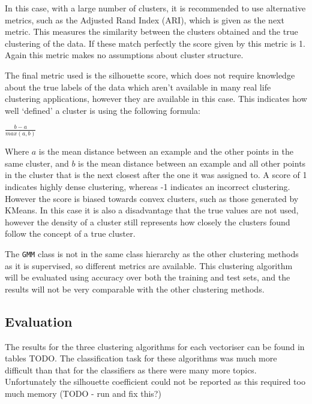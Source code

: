 \documentclass{article}
\begin{document}
In this case, with a large number of clusters, it is recommended to use alternative metrics, such as the Adjusted Rand Index (ARI), which is given as the next metric. This measures the similarity between the clusters obtained and the true clustering of the data. If these match perfectly the score given by this metric is 1. Again this metric makes no assumptions about cluster structure.

The final metric used is the silhouette score, which does not require knowledge about the true labels of the data which aren't available in many real life clustering applications, however they are available in this case.  This indicates how well `defined' a cluster is using the following formula:

\begin{center}
$\frac{b-a}{max(a,b)}$
\end{center}

Where $a$ is the mean distance between an example and the other points in the same cluster, and $b$ is the mean distance between an example and all other points in the cluster that is the next closest after the one it was assigned to. A score of 1 indicates highly dense clustering, whereas -1 indicates an incorrect clustering. However the score is biased towards convex clusters, such as those generated by KMeans. In this case it is also a disadvantage that the true values are not used, however the density of a cluster still represents how closely the clusters found follow the concept of a true cluster.

The \verb|GMM| class is not in the same class hierarchy as the other clustering methods as it is supervised, so different metrics are available. This clustering algorithm will be evaluated using accuracy over both the training and test sets, and the results will not be very comparable with the other clustering methods.  

\subsection{Evaluation}
The results for the three clustering algorithms for each vectoriser can be found in tables TODO. The classification task for these algorithms was much more difficult than that for the classifiers as there were many more topics. Unfortunately the silhouette coefficient could not be reported as this required too much memory (TODO - run and fix this?)
\end{document}
